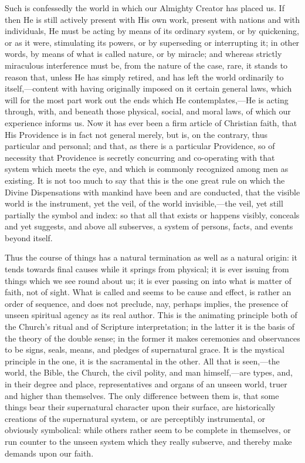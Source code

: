 Such is confessedly the world in which our
Almighty Creator has placed us. If then He is still actively present
with His own work, present with nations and with individuals, He must
be acting by means of its ordinary system, or by quickening, or as it
were, stimulating its powers, or by superseding or interrupting it; in
other words, by means of what is called nature, or by miracle; and
whereas strictly miraculous interference must be, from the nature of
the case, rare, it stands to reason that, unless He has simply
retired, and has left the world ordinarily to itself,—content with
having originally imposed on it certain general laws, which will for
the most part work out the ends which He contemplates,—He is acting
through, with, and beneath those physical, social, and moral laws, of
which our experience informs us. Now it has ever been a firm article
of Christian faith, that His Providence is in fact not general merely,
but is, on the contrary, thus particular and personal; and that, as
there is a particular Providence, so of necessity that Providence is
secretly concurring and co-operating with that system which meets the
eye, and which is commonly recognized among men as existing. It is not
too much to say that this is the one great rule on which the Divine
Dispensations with mankind have been and are conducted, that the
visible world is the instrument, yet the veil, of the world
invisible,—the veil, yet still partially the symbol and index: so
that all that exists or happens visibly, conceals and yet suggests,
and above all subserves, a system of persons, facts, and events beyond
itself.

Thus the course of things has a natural
termination as well as a natural origin: it tends towards final causes
while it springs from physical; it is ever issuing from things
which we see round about us; it is ever passing on into what is matter
of faith, not of sight. What is called and seems to be cause and
effect, is rather an order of sequence, and does not preclude, nay,
perhaps implies, the presence of unseen spiritual agency as its real
author. This is the animating principle both of the Church's ritual
and of Scripture interpretation; in the latter it is the basis of the
theory of the double sense; in the former it makes ceremonies and
observances to be signs, seals, means, and pledges of supernatural
grace. It is the mystical principle in the one, it is the sacramental
in the other. All that is seen,—the world, the Bible, the Church,
the civil polity, and man himself,—are types, and, in their degree
and place, representatives and organs of an unseen world, truer and
higher than themselves. The only difference between them is, that some
things bear their supernatural character upon their surface, are
historically creations of the supernatural system, or are perceptibly
instrumental, or obviously symbolical: while others rather seem to be
complete in themselves, or run counter to the unseen system which they
really subserve, and thereby make demands upon our faith.

